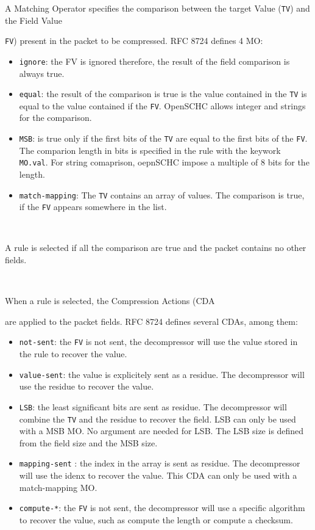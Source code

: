 \documentclass[onecolumn,12pt]{book}
\newcounter{c}
\begin{document}
A Matching Operator specifies the comparison between the target Value  (\texttt{TV}) and the Field Value {\texttt{FV}) present in the packet to be compressed. RFC 8724 defines 4 MO:

\begin{itemize}
\item \texttt{ignore}: the FV is ignored therefore, the result of the field comparison is always true.
\item \texttt{equal}: the result of the comparison is true is the value contained in the \texttt{TV} is equal to the value contained if the \texttt{FV}. OpenSCHC allows integer and strings for the comparison.
\item \texttt{MSB}: is true only if the first bits of the \texttt{TV} are equal to the first bits of the \texttt{FV}. The comparion length in bits is specified in the rule with the keywork \texttt{MO.val}. For string comaprison, oepnSCHC impose a  multiple of 8 bits for the length.
\item \texttt{match-mapping}: The \texttt{TV} contains an array of values. The comparison is true, if the \texttt{FV} appears somewhere in the list.
\end{itemize}

~

A rule is selected if all the comparison are true and the packet contains no other fields. 

~

When a rule is selected, the Compression Actions (CDA} are applied to the packet fields. RFC 8724 defines several CDAs, among them:

\begin{itemize}
\item \texttt{not-sent}: the \texttt{FV} is not sent, the decompressor will use the value stored in the rule to recover the value.
\item \texttt{value-sent}: the value is explicitely sent as a residue. The decompressor will use the residue to recover the value.
\item \texttt{LSB}: the least significant bits are sent as residue. The decompressor will combine the \texttt{TV} and the residue to recover the field. LSB can only be used with a MSB MO. No argument are needed for LSB. The LSB size is defined from the field size and the MSB size.
\item \texttt{mapping-sent} : the index in the array is sent as residue. The decompressor will use the idenx to recover the value. This CDA can only be used with a match-mapping MO.
\item \texttt{compute-*}: the \texttt{FV} is not sent, the decompressor will use a specific algorithm to recover the value, such as compute the length or compute a checksum.
\end{itemize}
	
\end{document}
